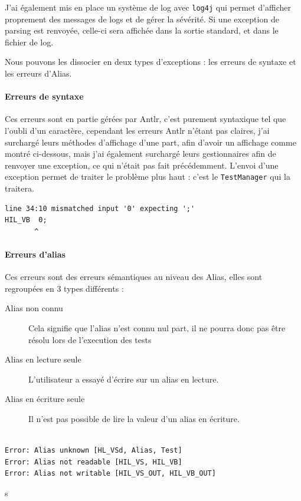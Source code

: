 J'ai également mis en place un système de log avec \texttt{log4j} qui permet d'afficher proprement des messages de logs et de gérer la sévérité. Si une exception de parsing est renvoyée, celle-ci sera affichée dans la sortie standard, et dans le fichier de log.

Nous pouvons les dissocier en deux types d'exceptions : les erreurs de syntaxe et les erreurs d'Alias. 
\paragraph{Erreurs de syntaxe} Ces erreurs sont en partie gérées par Antlr, c'est purement syntaxique tel que l'oubli d'un caractère, cependant les erreurs Antlr
n'étant pas claires, j'ai surchargé leurs méthodes d'affichage d'une part, afin d'avoir un affichage comme montré ci-dessous, mais j'ai également surchargé leurs gestionnaires afin de renvoyer une exception, ce qui n'était pas fait précédemment. L'envoi d'une exception permet de traiter le problème plus haut : c'est le \texttt{TestManager} qui la traitera.
\begin{lstlisting}[caption=Affichage d'une erreur de syntaxe, numbers=none]
line 34:10 mismatched input '0' expecting ';'
HIL_VB  0;
       ^
\end{lstlisting}


\paragraph{Erreurs d'alias} Ces erreurs sont des erreurs sémantiques au niveau des Alias, elles sont regroupées en 3 types différents : 
\begin{description}
	\item[Alias non connu] Cela signifie que l'alias n'est connu nul part, il ne pourra donc pas être résolu lors de l'execution des tests
	\item[Alias en lecture seule] L'utilisateur a essayé d'écrire sur un alias en lecture.
	\item[Alias en écriture seule] Il n'est pas possible de lire la valeur d'un alias en écriture.\\~
\end{description}

\begin{lstlisting}[caption=Affichage d'une erreur d'alias, numbers=none]
Error: Alias unknown [HL_VSd, Alias, Test]
Error: Alias not readable [HIL_VS, HIL_VB]
Error: Alias not writable [HIL_VS_OUT, HIL_VB_OUT]
\end{lstlisting}
	s	
